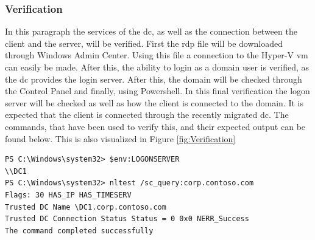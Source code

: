 \subsubsection{Verification}
In this paragraph the services of the \acrshort{dc}, as well as the connection between the client and the server, will be verified. First the \acrfull{rdp} file will be downloaded through Windows Admin Center. Using this file a connection to the Hyper-V \acrshort{vm} can easily be made. After this, the ability to login as a domain user is verified, as the \acrshort{dc} provides the login server. After this, the domain will be checked through the Control Panel and finally, using Powershell. In this final verification the logon server will be checked as well as how the client is connected to the domain. It is expected that the client is connected through the recently migrated \acrshort{dc}.
The commands, that have been used to verify this, and their expected output can be found below. This is also visualized in Figure \ref{fig:Verification}
\begin{lstlisting}[breaklines]
PS C:\Windows\system32> $env:LOGONSERVER
\\DC1
PS C:\Windows\system32> nltest /sc_query:corp.contoso.com
Flags: 30 HAS_IP HAS_TIMESERV
Trusted DC Name \DC1.corp.contoso.com
Trusted DC Connection Status Status = 0 0x0 NERR_Success
The command completed successfully
\end{lstlisting}


